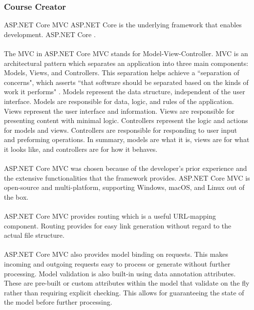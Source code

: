 \subsubsection{Course Creator}
ASP.NET Core MVC  ASP.NET Core is the underlying framework that enables development. ASP.NET Core .\\
\\
The MVC in ASP.NET Core MVC stands for Model-View-Controller. MVC is an architectural pattern which separates an application into three main components: Models, Views, and Controllers. This separation helps achieve a ``separation of concerns", which asserts ``that software should be separated based on the kinds of work it performs" \cite{separationOfConcerns}. Models represent the data structure, independent of the user interface. Models are responsible for data, logic, and rules of the application. Views represent the user interface and information. Views are responsible for presenting content with minimal logic. Controllers represent the logic and actions for models and views. Controllers are responsible for responding to user input and preforming operations. In summary, models are what it is, views are for what it looks like, and controllers are for how it behaves. \\
\\
ASP.NET Core MVC was chosen because of the developer's prior experience and the extensive functionalities that the framework provides. ASP.NET Core MVC is open-source and multi-platform, supporting Windows, macOS, and Linux out of the box. \\
\\
ASP.NET Core MVC provides routing which is a useful URL-mapping component. Routing provides for easy link generation without regard to the actual file structure.\\
\\
ASP.NET Core MVC also provides model binding on requests. This makes incoming and outgoing requests easy to process or generate without further processing. Model validation is also built-in using data annotation attributes. These are pre-built or custom attributes within the model that validate on the fly rather than requiring explicit checking. This allows for guaranteeing the state of the model before further processing. \\
